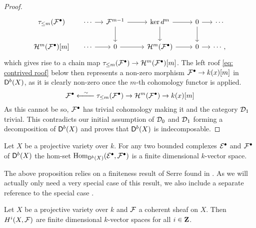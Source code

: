\begin{proof}
\[\begin{tikzcd}[row sep = small, column sep = small]
        {\rtruncation{m}(\mathcal F^\bullet)} & \cdots & {\mathcal F^{m-1}} && {\ker d^m} && 0 & \cdots \\
        \\
        {\mathcal H^m(\mathcal F^\bullet)[m]} & \cdots & 0 && {\mathcal H^m(\mathcal F^\bullet)} && 0 & \cdots,
        \arrow[from=1-2, to=1-3]
        \arrow[from=1-3, to=1-5]
        \arrow[from=1-3, to=3-3]
        \arrow[from=1-5, to=1-7]
        \arrow[from=1-5, to=3-5]
        \arrow[from=1-7, to=1-8]
        \arrow[from=1-7, to=3-7]
        \arrow[from=3-2, to=3-3]
        \arrow[from=3-3, to=3-5]
        \arrow[from=3-5, to=3-7]
        \arrow[from=3-7, to=3-8]
    \end{tikzcd}\]
    which gives rise to a chain map $\tau_{\leq m}(\mathcal F^\bullet) \to \mathcal H^m(\mathcal F^\bullet)[m]$. The left roof \eqref{eq: contrived roof} below then represents a non-zero morphism $\mathcal F^\bullet \to k(x)[m]$ in $\mathsf{D}^b(X)$, as it is clearly non-zero once the $m$-th cohomology functor is applied.
    \begin{equation}
        \label{eq: contrived roof}
        \mathcal F^\bullet \xleftarrow{\ \ \sim \ \ } \tau_{\leq m}(\mathcal F^\bullet) \to \mathcal H^m(\mathcal F^\bullet) \to k(x)[m]
    \end{equation}
    As this cannot be so, $\mathcal F^\bullet$ has trivial cohomology making it and the category $\mathcal D_1$ trivial. This contradicts our initial assumption of $\mathcal D_0$ and $\mathcal D_1$ forming a decomposition of $\mathsf{D}^b(X)$ and proves that $\mathsf{D}^b(X)$ is indecomposable. 
\end{proof}

\begin{proposition}
    \label{Db(X) has finite dimensional homs}
    Let $X$ be a projective variety over $k$.
    For any two bounded complexes $\mathcal E^\bullet$ and $\mathcal F^\bullet$ of $\mathsf{D}^b(X)$ the hom-set $\operatorname{Hom}_{\mathsf{D}^b(X)}(\mathcal E^\bullet, \mathcal F^\bullet)$ is a finite dimensional $k$-vector space. 
\end{proposition}

The above proposition relies on a finiteness result of Serre found in \cite[\S III, Theorem 5.2]{Hartshorne1977}. As we will actually only need a very special case of this result, we also include a separate reference to the special case \cite[\S II, Theorem 5.19]{Hartshorne1977}.

\begin{theorem}
    \label{Serre finitness}
    Let $X$ be a projective variety over $k$ and $\mathcal F$ a coherent sheaf on $X$. Then $H^{i}(X, \mathcal F)$ are finite dimensional $k$-vector spaces for all $i \in \mathbf Z$.
\end{theorem}

